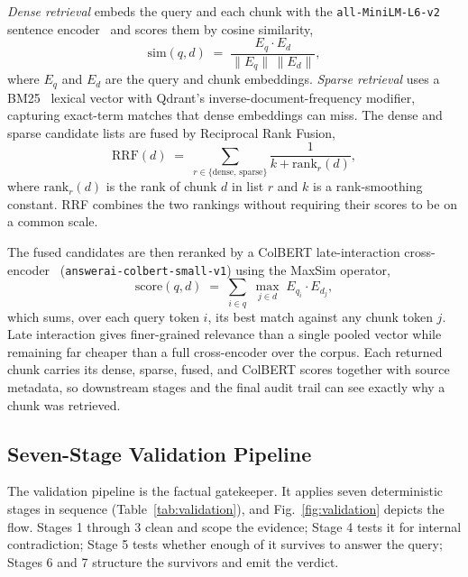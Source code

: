 \documentclass[conference]{IEEEtran}
\begin{document}
\textit{Dense retrieval} embeds the query and each chunk with the
\texttt{all-MiniLM-L6-v2} sentence encoder~\cite{reimers2019sbert} and
scores them by cosine similarity,
\begin{equation}
\mathrm{sim}(q,d) \;=\; \frac{E_q \cdot E_d}{\lVert E_q\rVert\,\lVert E_d\rVert},
\label{eq:cosine}
\end{equation}
where $E_q$ and $E_d$ are the query and chunk embeddings. \textit{Sparse
retrieval} uses a BM25~\cite{robertson2009bm25} lexical vector with Qdrant's
inverse-document-frequency modifier, capturing exact-term matches that dense
embeddings can miss.
The dense and sparse candidate lists are fused by Reciprocal Rank Fusion,
\begin{equation}
\mathrm{RRF}(d) \;=\; \sum_{r \in \{\text{dense},\,\text{sparse}\}}
\frac{1}{k + \mathrm{rank}_r(d)},
\label{eq:rrf}
\end{equation}
where $\mathrm{rank}_r(d)$ is the rank of chunk $d$ in list $r$ and $k$ is
a rank-smoothing constant. RRF combines the two rankings without requiring
their scores to be on a common scale.

The fused candidates are then reranked by a ColBERT late-interaction
cross-encoder~\cite{khattab2020colbert} (\texttt{answerai-colbert-small-v1})
using the MaxSim operator,
\begin{equation}
\mathrm{score}(q,d) \;=\; \sum_{i \in q}\; \max_{j \in d}\;
E_{q_i} \cdot E_{d_j},
\label{eq:maxsim}
\end{equation}
which sums, over each query token $i$, its best match against any chunk
token $j$. Late interaction gives finer-grained relevance than a single
pooled vector while remaining far cheaper than a full cross-encoder over
the corpus. Each returned chunk carries its dense, sparse, fused, and
ColBERT scores together with source metadata, so downstream stages and the
final audit trail can see exactly why a chunk was retrieved.

\subsection{Seven-Stage Validation Pipeline}
\label{sec:validation}
The validation pipeline is the factual gatekeeper. It applies seven
deterministic stages in sequence (Table~\ref{tab:validation}), and
Fig.~\ref{fig:validation} depicts the flow. Stages 1 through 3 clean and
scope the evidence; Stage 4 tests it for internal contradiction; Stage 5
tests whether enough of it survives to answer the query; Stages 6 and 7
structure the survivors and emit the verdict.
\end{document}
